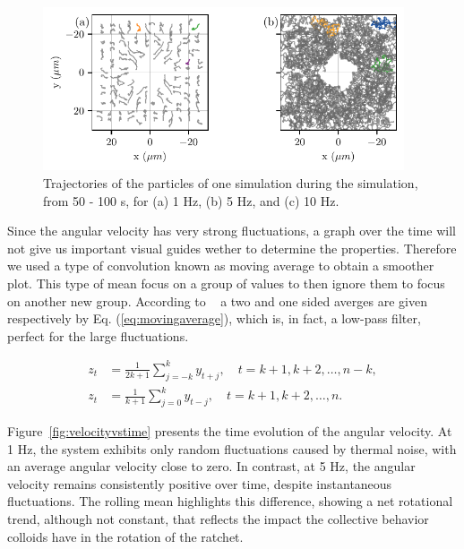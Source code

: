 \begin{figure}[h]
\begin{center}
\includegraphics[width=0.95\textwidth]{figures/parttrj.pdf}
\end{center}
\caption[Particle trajectories at different driving frequencies.]
{Trajectories of the particles of one simulation during the simulation, from 50 - 100 s, for (a) 1 Hz, (b) 5 Hz, and (c) 10 Hz.}
\label{fig:particletrj}
\end{figure}

Since the angular velocity has very strong fluctuations, a graph over the time will not give us important visual guides wether to determine the properties. Therefore we used a type of convolution known as moving average to obtain a smoother plot. This type of mean focus on a group of values to then ignore them to focus on another new group. According to ~\cite{hyndman2025moving} a two and one sided averges are given respectively by Eq. (\ref{eq:movingaverage}), which is, in fact, a low-pass filter, perfect for the large fluctuations.

\begin{align}
  z_t &= \frac{1}{2k+1} \sum^{k}_{j =-k} y_{t+j}, \quad t=k+1, k+2,\dots,n-k,\\
  z_t &= \frac{1}{k+1} \sum^{k}_{j =0} y_{t-j}, \quad t=k+1, k+2,\dots,n.
  \label{eq:movingaverage}
\end{align}

Figure~\ref{fig:velocityvstime} presents the time evolution of the angular velocity. At 1 Hz, the system exhibits only random fluctuations caused by thermal noise, with an average angular velocity close to zero. In contrast, at 5 Hz, the angular velocity remains consistently positive over time, despite instantaneous fluctuations. The rolling mean highlights this difference, showing a net rotational trend, although not constant, that reflects the impact the collective behavior colloids have in the rotation of the ratchet.

